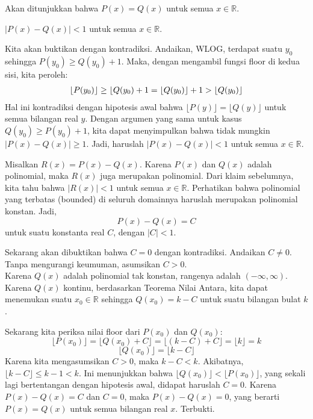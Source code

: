 

\begin{solusi}
Akan ditunjukkan bahwa $P(x)=Q(x)$ untuk semua $x \in \mathbb{R}$.

\begin{claim*}
    $|P(x) - Q(x)| < 1$ untuk semua $x \in \mathbb{R}$.
    \begin{bukti}
        Kita akan buktikan dengan kontradiksi. Andaikan, WLOG, terdapat suatu $y_0$ sehingga $P(y_0) \ge Q(y_0) + 1$. Maka, dengan mengambil fungsi floor di kedua sisi, kita peroleh:
        \begin{align*}
            \lfloor P(y_0) \rfloor \ge \lfloor Q(y_0) + 1 = \lfloor Q(y_0) \rfloor + 1 > \left\lfloor Q(y_0) \right\rfloor
        \end{align*}
        Hal ini kontradiksi dengan hipotesis awal bahwa $\lfloor P(y) \rfloor = \lfloor Q(y) \rfloor$ untuk semua bilangan real $y$. Dengan argumen yang sama untuk kasus $Q(y_0) \ge P(y_0) + 1$, kita dapat menyimpulkan bahwa tidak mungkin $|P(x) - Q(x)| \ge 1$. Jadi, haruslah $|P(x) - Q(x)| < 1$ untuk semua $x \in \mathbb{R}$.
    \end{bukti}
\end{claim*}


Misalkan $R(x) = P(x) - Q(x)$. Karena $P(x)$ dan $Q(x)$ adalah polinomial, maka $R(x)$ juga merupakan polinomial. Dari klaim sebelumnya, kita tahu bahwa $|R(x)| < 1$ untuk semua $x \in \mathbb{R}$. Perhatikan bahwa polinomial yang terbatas (bounded) di seluruh domainnya haruslah merupakan polinomial konstan. Jadi,
\[ P(x) - Q(x) = C \]
untuk suatu konstanta real $C$, dengan $|C| < 1$.

Sekarang akan dibuktikan bahwa $C=0$ dengan kontradiksi. Andaikan $C \neq 0$. Tanpa mengurangi keumuman, asumsikan $C>0$. \\
Karena $Q(x)$ adalah polinomial tak konstan, rangenya adalah $(-\infty, \infty)$. Karena $Q(x)$ kontinu, berdasarkan Teorema Nilai Antara, kita dapat menemukan suatu $x_0 \in \mathbb{R}$ sehingga $Q(x_0) = k - C$ untuk suatu bilangan bulat $k$.

Sekarang kita periksa nilai floor dari $P(x_0)$ dan $Q(x_0)$:
\[ \lfloor P(x_0) \rfloor = \lfloor Q(x_0) + C \rfloor = \lfloor (k-C) + C \rfloor = \lfloor k \rfloor = k \]
\[ \lfloor Q(x_0) \rfloor = \lfloor k-C \rfloor \]
Karena kita mengasumsikan $C>0$, maka $k-C < k$. Akibatnya, $\lfloor k-C \rfloor \le k-1 < k$.
Ini menunjukkan bahwa $\lfloor Q(x_0) \rfloor < \lfloor P(x_0) \rfloor$, yang sekali lagi bertentangan dengan hipotesis awal, didapat haruslah $C=0$. Karena $P(x) - Q(x) = C$ dan $C=0$, maka $P(x)-Q(x)=0$, yang berarti $P(x)=Q(x)$ untuk semua bilangan real $x$. Terbukti.

\end{solusi}